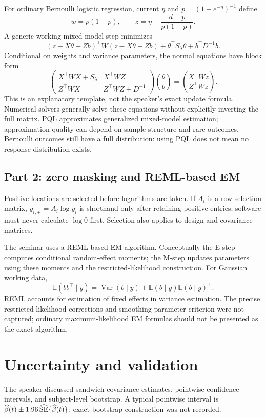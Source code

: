 \documentclass[11pt]{article}
\newcommand{\E}{\mathbb E}\newcommand{\Var}{\operatorname{Var}}\newcommand{\logit}{\operatorname{logit}}
\begin{document}
For ordinary Bernoulli logistic regression, current $\eta$ and $p=(1+e^{-\eta})^{-1}$ define
\[
w=p(1-p),\qquad z=\eta+\frac{d-p}{p(1-p)}.
\]
A generic working mixed-model step minimizes
\[
(z-X\theta-Zb)^\top W(z-X\theta-Zb)+\theta^\top S_\lambda\theta+b^\top D^{-1}b.
\]
Conditional on weights and variance parameters, the normal equations have block form
\[
\begin{pmatrix}X^\top WX+S_\lambda&X^\top WZ\\Z^\top WX&Z^\top WZ+D^{-1}\end{pmatrix}
\binom{\theta}{b}=\binom{X^\top Wz}{Z^\top Wz}.
\]
This is an explanatory template, not the speaker's exact update formula. Numerical solvers generally solve these equations without explicitly inverting the full matrix. PQL approximates generalized mixed-model estimation; approximation quality can depend on sample structure and rare outcomes. Bernoulli outcomes still have a full distribution: using PQL does not mean no response distribution exists.

\subsection{Part 2: zero masking and REML-based EM}
Positive locations are selected before logarithms are taken. If $A_i$ is a row-selection matrix, $y_{i,+}=A_i\log y_i$ is shorthand only after retaining positive entries; software must never calculate $\log0$ first. Selection also applies to design and covariance matrices.

The seminar uses a REML-based EM algorithm. Conceptually the E-step computes conditional random-effect moments; the M-step updates parameters using these moments and the restricted-likelihood construction. For Gaussian working data,
\[
\E(bb^\top\mid y)=\Var(b\mid y)+\E(b\mid y)\E(b\mid y)^\top.
\]
REML accounts for estimation of fixed effects in variance estimation. The precise restricted-likelihood corrections and smoothing-parameter criterion were not captured; ordinary maximum-likelihood EM formulas should not be presented as the exact algorithm.
\section{Uncertainty and validation}
The speaker discussed sandwich covariance estimates, pointwise confidence intervals, and subject-level bootstrap. A typical pointwise interval is $\widehat\beta(t)\pm1.96\,\widehat{\rm SE}\{\widehat\beta(t)\}$; exact bootstrap construction was not recorded.
\end{document}
